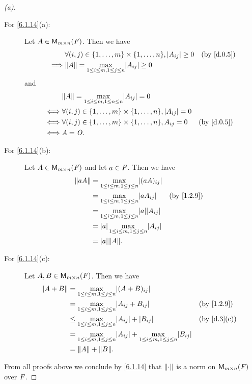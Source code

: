 \begin{proof}[(a)]
	\begin{description}
		\item[For \cref{6.1.14}(a):]
			Let \(A \in \mathsf{M}_{{m} \times n}({\mathit{F}})\).
			Then we have
			\begin{align*}
				         & \forall (i, j) \in \set{1, \dots, m} \times \set{1, \dots, n}, \abs{A_{i j}} \geq 0 &  & \by{d.0.5} \\
				\implies & \norm{A} = \max_{1 \leq i \leq m, 1 \leq j \leq n} \abs{A_{i j}} \geq 0
			\end{align*}
			and
			\begin{align*}
				     & \norm{A} = \max_{1 \leq i \leq m, 1 \leq n \leq n} \abs{A_{i j}} = 0                             \\
				\iff & \forall (i, j) \in \set{1, \dots, m} \times \set{1, \dots, n}, \abs{A_{i j}} = 0                 \\
				\iff & \forall (i, j) \in \set{1, \dots, m} \times \set{1, \dots, n}, A_{i j} = 0       &  & \by{d.0.5} \\
				\iff & A = \zm.
			\end{align*}
		\item[For \cref{6.1.14}(b):]
			Let \(A \in \mathsf{M}_{{m} \times n}({\mathit{F}})\) and let \(a \in \mathit{F}\).
			Then we have
			\begin{align*}
				\norm{a A} & = \max_{1 \leq i \leq m, 1 \leq j \leq n} \abs{(a A)_{i j}}                     \\
				           & = \max_{1 \leq i \leq m, 1 \leq j \leq n} \abs{a A_{i j}}       &  & \by{1.2.9} \\
				           & = \max_{1 \leq i \leq m, 1 \leq j \leq n} \abs{a} \abs{A_{i j}}                 \\
				           & = \abs{a} \max_{1 \leq i \leq m, 1 \leq j \leq n} \abs{A_{i j}}                 \\
				           & = \abs{a} \norm{A}.
			\end{align*}
		\item[For \cref{6.1.14}(c):]
			Let \(A, B \in \mathsf{M}_{{m} \times n}({\mathit{F}})\).
			Then we have
			\begin{align*}
				\norm{A + B} & = \max_{1 \leq i \leq m, 1 \leq j \leq n} \abs{(A + B)_{i j}}                                                                    \\
				             & = \max_{1 \leq i \leq m, 1 \leq j \leq n} \abs{A_{i j} + B_{i j}}                                               &  & \by{1.2.9}  \\
				             & \leq \max_{1 \leq i \leq m, 1 \leq j \leq n} \abs{A_{i j}} + \abs{B_{i j}}                                      &  & \by{d.3}[c] \\
				             & = \max_{1 \leq i \leq m, 1 \leq j \leq n} \abs{A_{i j}} + \max_{1 \leq i \leq m, 1 \leq j \leq n} \abs{B_{i j}}                  \\
				             & = \norm{A} + \norm{B}.
			\end{align*}
	\end{description}
	From all proofs above we conclude by \cref{6.1.14} that \(\left\lVert\cdot\right\rVert\) is a norm on \(\mathsf{M}_{{m} \times n}({\mathit{F}})\) over \(\mathit{F}\).
\end{proof}

